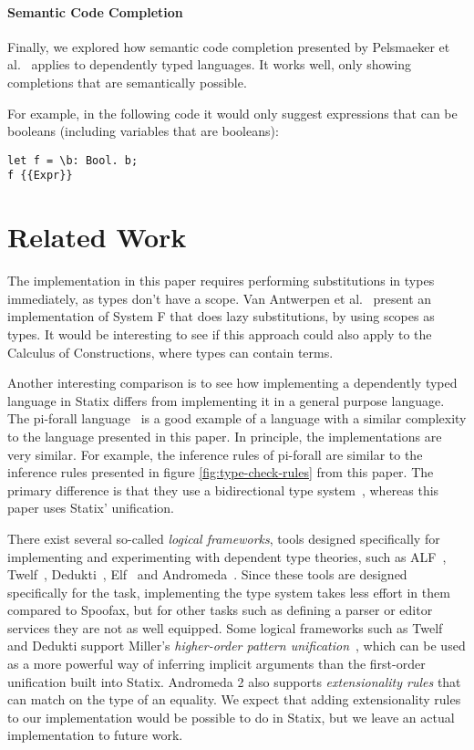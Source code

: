 \documentclass[a4paper,UKenglish,cleveref, autoref, thm-restate]{oasics-v2021}
\begin{document}
\paragraph*{Semantic Code Completion}
Finally, we explored how semantic code completion presented by Pelsmaeker et al.~\cite{codecompletion} applies to dependently typed languages. It works well, only showing completions that are semantically possible.

For example, in the following code it would only suggest expressions that can be booleans (including variables that are booleans):
\begin{lstlisting}
let f = \b: Bool. b;
f {{Expr}}
\end{lstlisting}


\section{Related Work}
The implementation in this paper requires performing substitutions in types immediately, as types don't have a scope. Van Antwerpen et al.~\cite[sect 2.5]{scopes_as_types} present an implementation of System F that does lazy substitutions, by using scopes as types. It would be interesting to see if this approach could also apply to the Calculus of Constructions, where types can contain terms. 

Another interesting comparison is to see how implementing a dependently typed language in Statix differs from implementing it in a general purpose language. The pi-forall language~\cite{pi_forall} is a good example of a language with a similar complexity to the language presented in this paper. In principle, the implementations are very similar. For example, the inference rules of pi-forall are similar to the inference rules presented in figure \ref{fig:type-check-rules} from this paper. The primary difference is that they use a bidirectional type system~\cite{bidirectional}, whereas this paper uses Statix' unification.

There exist several so-called \emph{logical frameworks}, tools designed specifically for implementing and experimenting with dependent type theories, such as ALF~\cite{MagnussonN93}, Twelf~\cite{PfenningS99}, Dedukti~\cite{BoespflugCH12}, Elf~\cite{pfenning_1991} and Andromeda~\cite{BauerHP20}. Since these tools are designed specifically for the task, implementing the type system takes less effort in them compared to Spoofax, but for other tasks such as defining a parser or editor services they are not as well equipped. Some logical frameworks such as Twelf and Dedukti support Miller's \emph{higher-order pattern unification}~\cite{Miller89}, which can be used as a more powerful way of inferring implicit arguments than the first-order unification built into Statix. Andromeda 2 also supports \emph{extensionality rules} that can match on the type of an equality. We expect that adding extensionality rules to our implementation would be possible to do in Statix, but we leave an actual implementation to future work.
\end{document}
